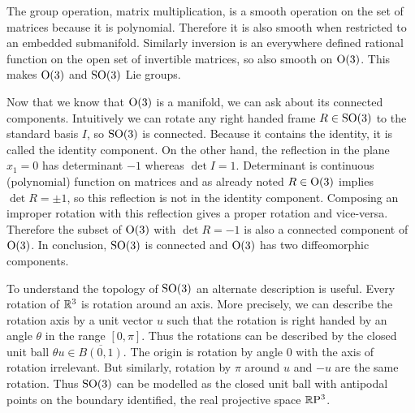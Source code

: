 The group operation, matrix multiplication, is a smooth operation on the set of matrices because it is polynomial.
Therefore it is also smooth when restricted to an embedded submanifold.
Similarly inversion is an everywhere defined rational function on the open set of invertible matrices, so also smooth on $\mathrm{O}(3)$.
This makes $\mathrm{O}(3)$ and $\mathrm{SO}(3)$ Lie groups.

Now that we know that $\mathrm{O}(3)$ is a manifold, we can ask about its connected components.
Intuitively we can rotate any right handed frame $R \in \mathrm{SO}(3)$ to the standard basis $I$, so $\mathrm{SO}(3)$ is connected.
Because it contains the identity, it is called the identity component.
On the other hand, the reflection in the plane $x_1 = 0$ has determinant $-1$ whereas $\det I = 1$.
Determinant is continuous (polynomial) function on matrices and as already noted $R \in \mathrm{O}(3)$ implies $\det R = \pm 1$, so this reflection is not in the identity component.
Composing an improper rotation with this reflection gives a proper rotation and vice-versa. Therefore the subset of $\mathrm{O}(3)$ with $\det R = -1$ is also a connected component of $\mathrm{O}(3)$.
In conclusion, $\mathrm{SO}(3)$ is connected and $\mathrm{O}(3)$ has two diffeomorphic components.

To understand the topology of $\mathrm{SO}(3)$ an alternate description is useful.
Every rotation of $\mathbb{R}^3$ is rotation around an axis.
More precisely, we can describe the rotation axis by a unit vector $u$ such that the rotation is right handed by an angle $\theta$ in the range $[0,\pi]$.
Thus the rotations can be described by the closed unit ball $\theta u \in \overline{B(0,1)}$.
The origin is rotation by angle $0$ with the axis of rotation irrelevant.
But similarly, rotation by $\pi$ around $u$ and $-u$ are the same rotation.
Thus $\mathrm{SO}(3)$ can be modelled as the closed unit ball with antipodal points on the boundary identified, the real projective space $\mathbb{R}\mathrm{P}^3$.

